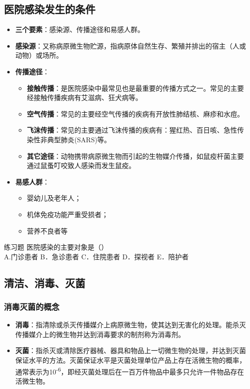 \documentclass[11pt, a4paper]{ctexart}
\begin{document}
\subsection{医院感染发生的条件}
\begin{itemize}
	\item \textbf{三个要素}：感染源、传播途径和易感人群。
	\item \textbf{感染源}：又称病原微生物贮源，指病原体自然生存、繁殖并排出的宿主（人或动物）或场所。
	\item \textbf{传播途径}：
	      \begin{itemize}
		      \item \textbf{接触传播}：是医院感染中最常见也是最重要的传播方式之一。常见的主要经接触传播疾病有艾滋病、狂犬病等。
		      \item \textbf{空气传播}：常见的主要经空气传播的疾病有开放性肺结核、麻疹和水痘。
		      \item \textbf{飞沫传播}：常见的主要通过飞沫传播的疾病有：猩红热、百日咳、急性传染性非典型肺炎(SARS)等。
		      \item \textbf{其它途径}：动物携带病原微生物而引起的生物媒介传播，如鼠疫杆菌主要通过鼠蚤叮咬致人感染而发生鼠疫。
	      \end{itemize}
	\item \textbf{易感人群}：
	      \begin{itemize}
		      \item 婴幼儿及老年人；
		      \item 机体免疫功能严重受损者；
		      \item 营养不良者等
	      \end{itemize}
\end{itemize}

\begin{examplebox}{练习题}
	医院感染的主要对象是（\qquad）\\
	A.门诊患者 \quad B．急诊患者 \quad C．住院患者 \quad D．探视者 \quad E．陪护者
\end{examplebox}

\subsection{清洁、消毒、灭菌}
\subsubsection{消毒灭菌的概念}
\begin{itemize}
	\item \textbf{消毒}：指清除或杀灭传播媒介上病原微生物，使其达到无害化的处理。能杀灭传播媒介上的微生物并达到消毒要求的制剂称为消毒剂。
	\item \textbf{灭菌}：指杀灭或清除医疗器械、器具和物品上一切微生物的处理，并达到灭菌保证水平的方法。灭菌保证水平是灭菌处理单位产品上存在活微生物的概率，通常表示为10\textsuperscript{-6}，即经灭菌处理后在一百万件物品中最多只允许一件物品存在活微生物。
\end{itemize}
\end{document}
